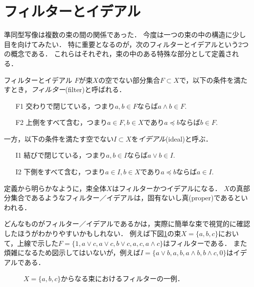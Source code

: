 \documentclass[11pt,a4paper]{jsarticle}
\begin{document}
\section{フィルターとイデアル}
準同型写像は複数の束の間の関係であった．
今度は一つの束の中の構造に少し目を向けてみたい．
特に重要となるのが，次のフィルターとイデアルという2つの概念である．
これらはそれぞれ，束の中のある特殊な部分として定義される．
\begin{itembox}[l]{フィルターとイデアル}
$F$が束$X$の空でない部分集合$F \subset X$で，以下の条件を満たすとき，\emph{フィルター}(filter)と呼ばれる．
\begin{enumerate}
    \item[F1] 交わりで閉じている，つまり$a, b \in F$ならば$a \wedge b \in F$.
    \item[F2] 上側をすべて含む，つまり$a \in F, b \in X$であり$a \preceq b$ならば$b \in F$.
\end{enumerate}
一方，以下の条件を満たす空でない$I \subset X$を\emph{イデアル}(ideal)と呼ぶ．
\begin{enumerate}
    \item[I1] 結びで閉じている，つまり$a, b \in I$ならば$a \vee b \in I$.
    \item[I2] 下側をすべて含む，つまり$a \in I, b \in X$であり$a \preceq b$ならば$a \in I$.
\end{enumerate}
\end{itembox}

定義から明らかなように，束全体$X$はフィルターかつイデアルになる．
$X$の真部分集合であるようなフィルター／イデアルは，固有ないし真(proper)であるといわれる．

どんなものがフィルター／イデアルであるかは，実際に簡単な束で視覚的に確認したほうがわかりやすいかもしれない．
例えば下図\ref{fig:3bool}の束$X = \{ a, b, c\}$において，上線で示した$F =\{ 1, a\vee c, a\vee c, b\vee c, a, c, a \wedge c\}$はフィルターである．
また煩雑になるため図示してはいないが，例えば$I =\{ a \vee b, a, b, a\wedge b, b \wedge c, 0 \}$はイデアルである．
\begin{figure}[h]
    \centering
    \caption{$X = \{a, b, c\}$からなる束におけるフィルターの一例．}
    \label{fig:3bool} 
\end{figure}
\end{document}
